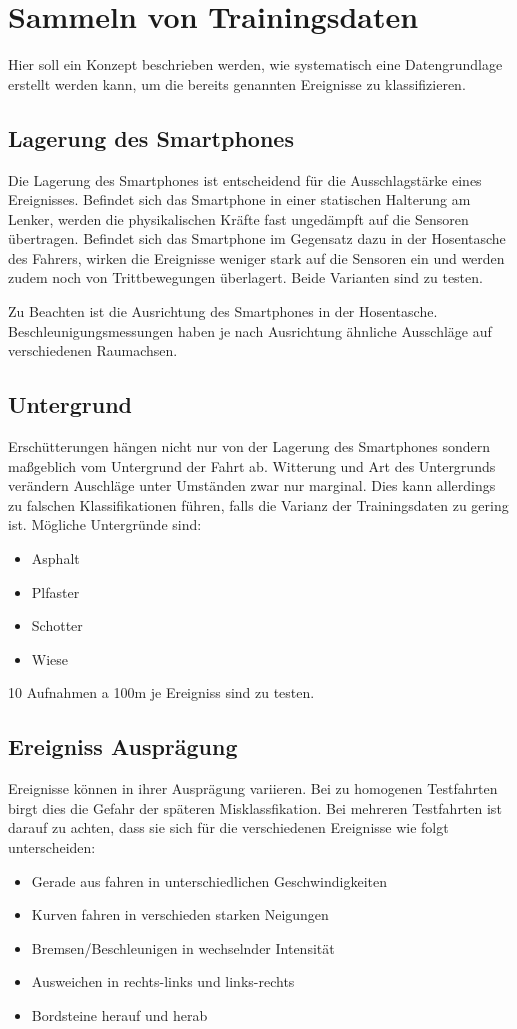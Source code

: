 \section{Sammeln von Trainingsdaten}
Hier soll ein Konzept beschrieben werden, wie systematisch eine Datengrundlage erstellt werden kann, um die bereits genannten Ereignisse zu klassifizieren.

\subsection{Lagerung des Smartphones}
Die Lagerung des Smartphones ist entscheidend für die Ausschlagstärke eines Ereignisses. 
Befindet sich das Smartphone in einer statischen Halterung am Lenker, werden die physikalischen Kräfte fast ungedämpft auf die Sensoren übertragen.
Befindet sich das Smartphone im Gegensatz dazu in der Hosentasche des Fahrers, wirken die Ereignisse weniger stark auf die Sensoren ein und werden zudem noch von Trittbewegungen überlagert.
Beide Varianten sind zu testen.

Zu Beachten ist die Ausrichtung des Smartphones in der Hosentasche. Beschleunigungsmessungen haben je nach Ausrichtung ähnliche Ausschläge auf verschiedenen Raumachsen.

\subsection{Untergrund}
Erschütterungen hängen nicht nur von der Lagerung des Smartphones sondern maßgeblich vom Untergrund der Fahrt ab.
Witterung und Art des Untergrunds verändern Auschläge unter Umständen zwar nur marginal.
Dies kann allerdings zu falschen Klassifikationen führen, falls die Varianz der Trainingsdaten zu gering ist.
Mögliche Untergründe sind:
\begin{itemize}
\item Asphalt
\item Plfaster
\item Schotter
\item Wiese
\end{itemize}
10 Aufnahmen a 100m je Ereigniss sind zu testen.

\subsection{Ereigniss Ausprägung}
Ereignisse können in ihrer Ausprägung variieren. 
Bei zu homogenen Testfahrten birgt dies die Gefahr der späteren Misklassfikation.
Bei mehreren Testfahrten ist darauf zu achten, dass sie sich für die verschiedenen Ereignisse wie folgt unterscheiden:
\begin{itemize}
\item Gerade aus fahren in unterschiedlichen Geschwindigkeiten
\item Kurven fahren in verschieden starken Neigungen
\item Bremsen/Beschleunigen in wechselnder Intensität
\item Ausweichen in rechts-links und links-rechts
\item Bordsteine herauf und herab 
\end{itemize}

